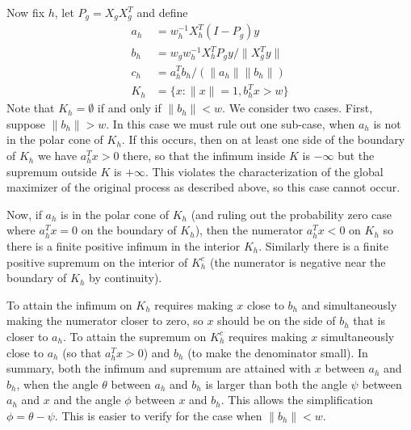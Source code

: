 \documentclass{imsart}
\newcommand{\norm}[1]{\lVert #1 \rVert}
\begin{document}
Now fix $h$, let $P_g = X_gX_g^T$ and define
\begin{align*}
a_h &= w_h^{-1} X_h^T (I-P_g) y \\
b_h &= w_g w_h^{-1} X_h^T P_g y / \norm{X_g^T y} \\
c_h &= a_h^T b_h / (\norm{a_h} \norm{b_h}) \\
K_h   &= \{ x : \norm{x} = 1, b_h^Tx > w \}
\end{align*}
Note that $K_h = \emptyset$ if and only if $\norm{b_h} < w$. We consider two cases. First, suppose $\norm{b_h} > w$. In this case we must rule out one sub-case, when $a_h$ is not in the polar cone of $K_h$. If this occurs, then on at least one side of the boundary of $K_h$ we have $a_h^Tx > 0$ there, so that the infimum inside $K$ is $-\infty$ but the supremum outside $K$ is $+\infty$. This violates the characterization of the global maximizer of the original process as described above, so this case cannot occur.

Now, if $a_h$ is in the polar cone of $K_h$ (and ruling out the probability zero case where $a_h^Tx = 0$ on the boundary of $K_h$), then the numerator $a_h^Tx < 0$ on $K_h$ so there is a finite positive infimum in the interior $K_h$. Similarly there is a finite positive supremum on the interior of $K_h^c$ (the numerator is negative near the boundary of $K_h$ by continuity).

To attain the infimum on $K_h$ requires making $x$ close to $b_h$ and simultaneously making the numerator closer to zero, so $x$ should be on the side of $b_h$ that is closer to $a_h$. To attain the supremum on $K_h^c$ requires making $x$ simultaneously close to $a_h$ (so that $a_h^Tx > 0$) and $b_h$ (to make the denominator small). In summary, both the infimum and supremum are attained with $x$ between $a_h$ and $b_h$, when the angle $\theta$ between $a_h$ and $b_h$ is larger than both the angle $\psi$ between $a_h$ and $x$ and the angle $\phi$ between $x$ and $b_h$. This allows the simplification $\phi = \theta - \psi$. This is easier to verify for the case when $\norm{b_h} < w$.
\end{document}
